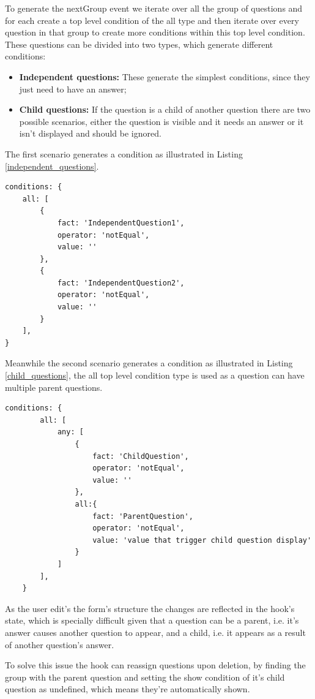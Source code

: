 To generate the nextGroup event we iterate over all the group of questions and for each create a top level condition of the all type and then iterate over every question in that group to create more conditions within this top level condition.
These questions can be divided into two types, which generate different conditions:
\begin{itemize}
	\item \textbf{Independent questions:} These generate the simplest conditions, since they just need to have an answer;
	\item \textbf{Child questions:} If the question is a child of another question there are two possible scenarios, either the question is visible and it needs an answer or it isn't displayed and should be ignored. 
\end{itemize}

The first scenario generates a condition as illustrated in Listing \ref{independent_questions}.
\begin{lstlisting}[style=sharpc, caption={Condition generated by an independent questions}, label={independent_questions}]
conditions: {
	all: [
		{
			fact: 'IndependentQuestion1',
			operator: 'notEqual',
			value: ''
		},
		{
			fact: 'IndependentQuestion2',
			operator: 'notEqual',
			value: ''
		}
	],
}
\end{lstlisting}

Meanwhile the second scenario generates a condition as illustrated in Listing \ref{child_questions}, the all top level condition type is used as a question can have multiple parent questions.

\begin{lstlisting}[style=sharpc, caption={Condition generated by a child questions}, label={child_questions}]
	conditions: {
		all: [
			any: [
				{
					fact: 'ChildQuestion',
					operator: 'notEqual',
					value: ''
				},
				all:{
					fact: 'ParentQuestion',
					operator: 'notEqual',
					value: 'value that trigger child question display'
				}
			]
		],
	}
\end{lstlisting}


As the user edit's the form's structure the changes are reflected in the hook's state, which is specially difficult given that a question can be a parent, i.e. it's answer causes another question to appear, and a child, i.e. it appears as a result of another question's answer.

To solve this issue the hook can reassign questions upon deletion, by finding the group with the parent question and setting the show condition of it's child question as undefined, which means they're automatically shown.

